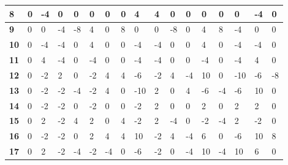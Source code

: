 \begin{longtable}[c]{|l|l|l|l|l|l|l|l|l|l|l|l|l|l|l|l|l|}
\textbf{8}  & 0          & -4         & 0          & 0          & 0          & 0          & 0          & 4          & 4          & 0          & 0           & 0           & 0           & 0           & -4          & 0           \\ \hline
\textbf{9}  & 0          & 0          & -4         & -8         & 4          & 0          & 8          & 0          & 0          & -8         & 0           & 4           & 8           & -4          & 0           & 0           \\ \hline
\textbf{10} & 0          & -4         & -4         & 0          & 4          & 0          & 0          & -4         & -4         & 0          & 0           & 4           & 0           & -4          & -4          & 0           \\ \hline
\textbf{11} & 0          & 4          & -4         & 0          & -4         & 0          & 0          & -4         & -4         & 0          & 0           & -4          & 0           & -4          & 4           & 0           \\ \hline
\textbf{12} & 0          & -2         & 2          & 0          & -2         & 4          & 4          & -6         & -2         & 4          & -4          & 10          & 0           & -10         & -6          & -8          \\ \hline
\textbf{13} & 0          & -2         & -2         & -4         & -2         & 4          & 0          & -10        & 2          & 0          & 4           & -6          & -4          & -6          & 10          & 0           \\ \hline
\textbf{14} & 0          & -2         & -2         & 0          & -2         & 0          & 0          & -2         & 2          & 0          & 0           & 2           & 0           & 2           & 2           & 0           \\ \hline
\textbf{15} & 0          & 2          & -2         & 4          & 2          & 0          & 4          & -2         & 2          & -4         & 0           & -2          & -4          & 2           & -2          & 0           \\ \hline
\textbf{16} & 0          & -2         & -2         & 0          & 2          & 4          & 4          & 10         & -2         & 4          & -4          & 6           & 0           & -6          & 10          & 8           \\ \hline
\textbf{17} & 0          & 2          & -2         & -4         & -2         & -4         & 0          & -6         & -2         & 0          & -4          & 10          & -4          & 10          & 6           & 0           \\ \hline

\end{longtable}
